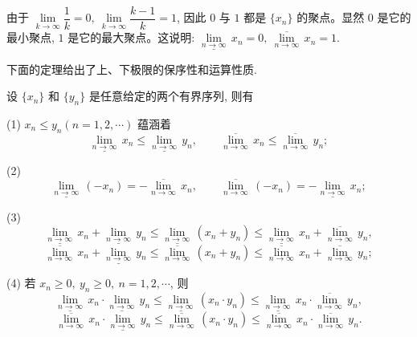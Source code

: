 \begin{solve}[{解法 2}]
由于 $\lim\limits_{k\to\infty}\dfrac1k=0,\ \lim\limits_{k\to\infty}\dfrac{k-1}{k}=1$, 因此 $0$ 与 $1$ 都是 $\{x_n\}$ 的聚点。显然 $0$ 是它的最小聚点, $1$ 是它的最大聚点。这说明: $\underline{\lim\limits_{n\to\infty}}\,x_n=0,\ \overline{\lim\limits_{n\to\infty}}\,x_n=1$.

下面的定理给出了上、下极限的保序性和运算性质.
\end{solve}


\begin{theorem}\label{theorem:ma-2-5-3}
设 $\{x_n\}$ 和 $\{y_n\}$ 是任意给定的两个有界序列, 则有

(1) $x_n\leqslant y_n(n=1,2,\cdots)$ 蕴涵着
\[
  \underline{\lim_{n\to\infty}}\,x_n
  \leqslant
  \underline{\lim_{n\to\infty}}\,y_n,
  \qquad
  \overline{\lim_{n\to\infty}}\,x_n
  \leqslant
  \overline{\lim_{n\to\infty}}\,y_n;
\]

(2)
\[
  \underline{\lim_{n\to\infty}}\,(-x_n)
  =
  -\overline{\lim_{n\to\infty}}\,x_n,
  \qquad
  \overline{\lim_{n\to\infty}}\,(-x_n)
  =
  -\underline{\lim_{n\to\infty}}\,x_n;
\]

(3)
\[
  \underline{\lim_{n\to\infty}}\,x_n
  +
  \underline{\lim_{n\to\infty}}\,y_n
  \leqslant
  \underline{\lim_{n\to\infty}}\,(x_n+y_n)
  \leqslant
  \underline{\lim_{n\to\infty}}\,x_n
  +
  \overline{\lim_{n\to\infty}}\,y_n,
\]
\[
  \overline{\lim_{n\to\infty}}\,x_n
  +
  \underline{\lim_{n\to\infty}}\,y_n
  \leqslant
  \overline{\lim_{n\to\infty}}\,(x_n+y_n)
  \leqslant
  \overline{\lim_{n\to\infty}}\,x_n
  +
  \overline{\lim_{n\to\infty}}\,y_n;
\]

(4) 若 $x_n\geqslant0,\ y_n\geqslant0,\ n=1,2,\cdots$, 则
\[
  \underline{\lim_{n\to\infty}}\,x_n\cdot
  \underline{\lim_{n\to\infty}}\,y_n
  \leqslant
  \underline{\lim_{n\to\infty}}\,(x_n\cdot y_n)
  \leqslant
  \underline{\lim_{n\to\infty}}\,x_n\cdot
  \overline{\lim_{n\to\infty}}\,y_n,
\]
\[
  \overline{\lim_{n\to\infty}}\,x_n\cdot
  \underline{\lim_{n\to\infty}}\,y_n
  \leqslant
  \overline{\lim_{n\to\infty}}\,(x_n\cdot y_n)
  \leqslant
  \overline{\lim_{n\to\infty}}\,x_n\cdot
  \overline{\lim_{n\to\infty}}\,y_n.
\]
\end{theorem}


